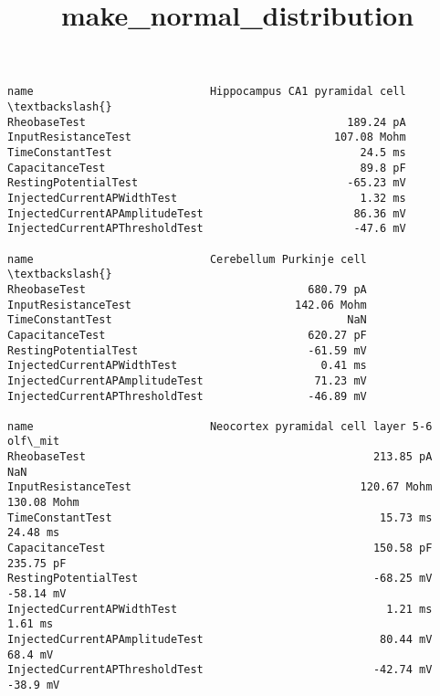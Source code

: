 \documentclass[11pt]{article}
\title{make\_normal\_distribution}
\begin{document}
    
    \maketitle
    
    

    
            \begin{tcolorbox}[breakable, size=fbox, boxrule=.5pt, pad at break*=1mm, opacityfill=0]
\begin{Verbatim}[commandchars=\\\{\}]
name                           Hippocampus CA1 pyramidal cell  \textbackslash{}
RheobaseTest                                        189.24 pA
InputResistanceTest                               107.08 Mohm
TimeConstantTest                                      24.5 ms
CapacitanceTest                                       89.8 pF
RestingPotentialTest                                -65.23 mV
InjectedCurrentAPWidthTest                            1.32 ms
InjectedCurrentAPAmplitudeTest                       86.36 mV
InjectedCurrentAPThresholdTest                       -47.6 mV

name                           Cerebellum Purkinje cell  \textbackslash{}
RheobaseTest                                  680.79 pA
InputResistanceTest                         142.06 Mohm
TimeConstantTest                                    NaN
CapacitanceTest                               620.27 pF
RestingPotentialTest                          -61.59 mV
InjectedCurrentAPWidthTest                      0.41 ms
InjectedCurrentAPAmplitudeTest                 71.23 mV
InjectedCurrentAPThresholdTest                -46.89 mV

name                           Neocortex pyramidal cell layer 5-6      olf\_mit
RheobaseTest                                            213.85 pA          NaN
InputResistanceTest                                   120.67 Mohm  130.08 Mohm
TimeConstantTest                                         15.73 ms     24.48 ms
CapacitanceTest                                         150.58 pF    235.75 pF
RestingPotentialTest                                    -68.25 mV    -58.14 mV
InjectedCurrentAPWidthTest                                1.21 ms      1.61 ms
InjectedCurrentAPAmplitudeTest                           80.44 mV      68.4 mV
InjectedCurrentAPThresholdTest                          -42.74 mV     -38.9 mV
\end{Verbatim}
\end{tcolorbox}
        
\end{document}
